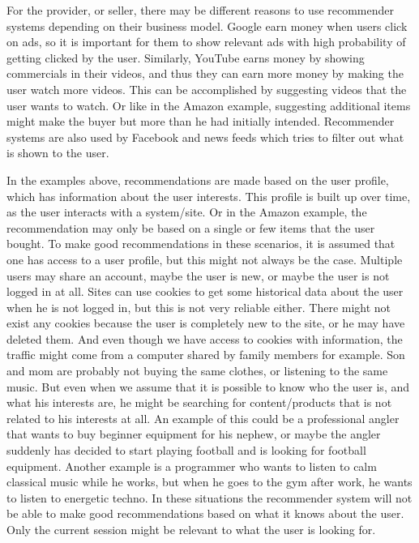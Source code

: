 For the provider, or seller, there may be different reasons to use recommender systems depending on their business model. Google earn money when users click on ads, so it is important for them to show relevant ads with high probability of getting clicked by the user. Similarly, YouTube earns money by showing commercials in their videos, and thus they can earn more money by making the user watch more videos. This can be accomplished by suggesting videos that the user wants to watch. Or like in the Amazon example, suggesting additional items might make the buyer but more than he had initially intended. Recommender systems are also used by Facebook and news feeds which tries to filter out what is shown to the user.


In the examples above, recommendations are made based on the user profile, which has information about the user interests. This profile is built up over time, as the user interacts with a system/site. Or in the Amazon example, the recommendation may only be based on a single or few items that the user bought. To make good recommendations in these scenarios, it is assumed that one has access to a user profile, but this might not always be the case. Multiple users may share an account, maybe the user is new, or maybe the user is not logged in at all. Sites can use cookies to get some historical data about the user when he is not logged in, but this is not very reliable either. There might not exist any cookies because the user is completely new to the site, or he may have deleted them. And even though we have access to cookies with information, the traffic might come from a computer shared by family members for example. Son and mom are probably not buying the same clothes, or listening to the same music. But even when we assume that it is possible to know who the user is, and what his interests are, he might be searching for content/products that is not related to his interests at all. An example of this could be a professional angler that wants to buy beginner equipment for his nephew, or maybe the angler suddenly has decided to start playing football and is looking for football equipment. Another example is a programmer who wants to listen to calm classical music while he works, but when he goes to the gym after work, he wants to listen to energetic techno. In these situations the recommender system will not be able to make good recommendations based on what it knows about the user. Only the current session might be relevant to what the user is looking for.

